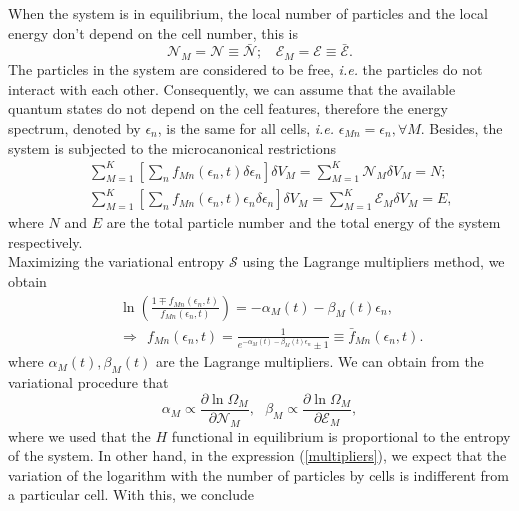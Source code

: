 \documentclass{article}
\newcommand{\de}{\delta}
\newcommand{\Ss}{\mathcal{S}}
\begin{document}
When the system is in equilibrium, the local number of particles and the local energy don't depend on the cell number, this is
\begin{equation}
   {\mathcal{N}}_M=\mathcal{N}\equiv \bar{\mathcal{N}}; \ \ \ \  {\mathcal{E}}_M=\mathcal{E}\equiv \bar{\mathcal{E}}.
\end{equation}
The particles in the system are considered to be free, \textit{i.e.} the particles do not interact with each other.
Consequently, we can assume that the available quantum states do not depend on the cell features,
therefore the energy spectrum, denoted by $\epsilon_n$, is the same for all cells, \textit{i.e.} $\epsilon_{Mn} = \epsilon_n, \forall M$. Besides, the system is subjected to the microcanonical restrictions
\begin{eqnarray}
    &&\sum_{M=1}^{K} \left[ \sum_{n}f_{Mn}(\epsilon_{n} ,t)\de \epsilon_n\right] \de V_M=\sum_{M=1}^{K} {\mathcal{N}}_{M} \de V_M=N; \nonumber \\
    &&\sum_{M=1}^{K}\left[ \sum_{n}f_{Mn}(\epsilon_{n},t)\epsilon_{n}\delta \epsilon_n\right] \de V_M=\sum_{M=1}^{K} {\mathcal{E}}_M \delta V_M=E, \label{restriccions1}
\end{eqnarray}
where $N$ and $E$ are the total particle number and the total energy of the system respectively.\\ 
Maximizing the variational entropy $\Ss$ using the Lagrange multipliers method, we obtain
\begin{eqnarray}
&&\ln \left(\frac{1\mp f_{Mn}(\epsilon_{n},t)}{f_{Mn}(\epsilon_{n},t)} \right)=-\alpha_M(t)-\beta_M(t) \epsilon_{n}, \label{relation}\\ &&\Rightarrow \ \ f_{Mn}(\epsilon_{n},t)=\frac{1}{e^{-\alpha_M(t)-\beta_M(t) \epsilon_{n}}\pm 1} \equiv \bar{f}_{Mn}(\epsilon_{n},t) \label{distributionequilibrium}.
\end{eqnarray}
where $\alpha_M(t), \beta_M(t)$ are the Lagrange multipliers. We can obtain from the variational procedure that 
\begin{equation}
    \alpha_M\propto \frac{\partial \ln \Omega_M}{\partial \mathcal{N}_M}, \ \ \ \beta_M\propto \frac{\partial \ln \Omega_M}{\partial \mathcal{E}_M},\label{multipliers}
\end{equation}
where we used that the $H$ functional in equilibrium is proportional to the entropy of the system.
In other hand, in the expression (\ref{multipliers}), we expect that the variation of the logarithm with the number of particles by cells is indifferent from a particular cell. With this, we conclude  
\end{document}
